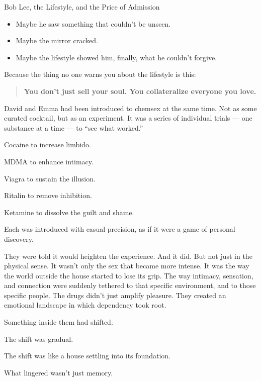 \begin{HistoricalSidebar}{Bob Lee, the Lifestyle, and the Price of Admission}
  \medskip
  
  \begin{itemize}
    \item Maybe he saw something that couldn’t be unseen.
    \item Maybe the mirror cracked.
    \item Maybe the lifestyle showed him, finally,  what he couldn’t forgive.
  \end{itemize}

  \medskip
  
  Because the thing no one warns you about the lifestyle is this: 

  \begin{quote}
    \textbf{You don’t just sell your soul.  You collateralize everyone you love.}
  \end{quote}
  
\end{HistoricalSidebar}

\medskip

David and Emma had been introduced to chemsex at the same time. Not as some curated cocktail, but as an experiment. 
It was a series of individual trials --- one substance at a time --- to ``see what worked.'' 

Cocaine to increase limbido. 

MDMA to enhance intimacy. 

Viagra to sustain the illusion. 

Ritalin to remove inhibition. 

Ketamine to dissolve the guilt and shame. 

Each was introduced with casual precision, as if it were a game of personal discovery.

They were told it would heighten the experience. And it did. But not just in the physical sense. It wasn’t only 
the sex that became more intense. It was the way the world outside the house started to lose its grip. 
The way intimacy, sensation, and connection were suddenly tethered to that specific environment, and to those 
specific people. The drugs didn’t just amplify pleasure. They created an emotional landscape in which 
dependency took root.

Something inside them had shifted. 

The shift was gradual. 

The shift was like a house settling into its foundation. 

What lingered wasn’t just memory. 

